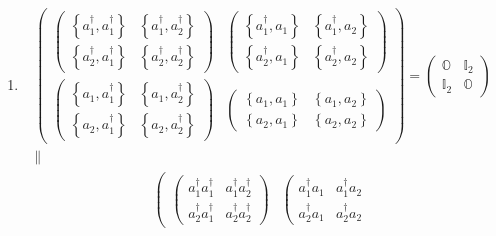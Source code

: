 \documentclass[aps,preprint]{revtex4}
\begin{document}
\begin{enumerate}
\item 
\begin{gather}
\left( 
\begin{array}{cc}
\left( 
\begin{array}{cc}
\left\{ a_{1}^{\dagger },a_{1}^{\dagger }\right\} & \left\{ a_{1}^{\dagger
},a_{2}^{\dagger }\right\} \\ 
\left\{ a_{2}^{\dagger },a_{1}^{\dagger }\right\} & \left\{ a_{2}^{\dagger
},a_{2}^{\dagger }\right\}%
\end{array}%
\right) & \left( 
\begin{array}{cc}
\left\{ a_{1}^{\dagger },a_{1}\right\} & \left\{ a_{1}^{\dagger
},a_{2}\right\} \\ 
\left\{ a_{2}^{\dagger },a_{1}\right\} & \left\{ a_{2}^{\dagger
},a_{2}\right\}%
\end{array}%
\right) \\ 
\left( 
\begin{array}{cc}
\left\{ a_{1},a_{1}^{\dagger }\right\} & \left\{ a_{1},a_{2}^{\dagger
}\right\} \\ 
\left\{ a_{2},a_{1}^{\dagger }\right\} & \left\{ a_{2},a_{2}^{\dagger
}\right\}%
\end{array}%
\right) & \left( 
\begin{array}{cc}
\left\{ a_{1},a_{1}\right\} & \left\{ a_{1},a_{2}\right\} \\ 
\left\{ a_{2},a_{1}\right\} & \left\{ a_{2},a_{2}\right\}%
\end{array}%
\right)%
\end{array}%
\right) =\left( 
\begin{array}{cc}
\mathbb{O} & \mathbb{I}_{2} \\ 
\mathbb{I}_{2} & \mathbb{O}%
\end{array}%
\right) \\
\parallel
\end{gather}%
\begin{gather}
\left( 
\begin{array}{cc}
\left( 
\begin{array}{cc}
a_{1}^{\dagger }a_{1}^{\dagger } & a_{1}^{\dagger }a_{2}^{\dagger } \\ 
a_{2}^{\dagger }a_{1}^{\dagger } & a_{2}^{\dagger }a_{2}^{\dagger }%
\end{array}%
\right) & \left( 
\begin{array}{cc}
a_{1}^{\dagger }a_{1} & a_{1}^{\dagger }a_{2} \\ 
a_{2}^{\dagger }a_{1} & a_{2}^{\dagger }a_{2}%
\end{array}%

\end{array}
\end{gather}
\end{enumerate}
\end{document}
